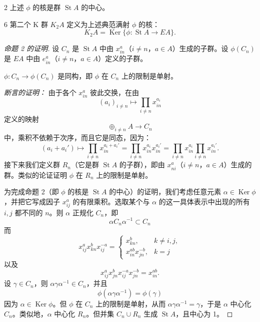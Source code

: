 \begin{prop}{2}
上述 $\phi$ 的核是群 $\operatorname{St}A$ 的中心。
\end{prop}

\begin{defn}{6}
第二个 K 群 $K_2A$ 定义为上述典范满射 $\phi$ 的核：
\[
  K_2A = \operatorname{Ker}\{\phi : \operatorname{St}A \to EA\}.
\]
\end{defn}

\begin{proof}[命题 2 的证明]
设 $C_n$ 是 $\operatorname{St}A$ 中由 $x_{in}^a$（$i\ne n$，$a\in A$）生成的子群。设 $\phi(C_n)$ 是 $EA$ 中由 $e_{in}^a$（$i\ne n$，$a\in A$）定义的子群。

 $\phi : C_n \to \phi(C_n)$ 是同构，即 $\phi$ 在 $C_n$ 上的限制是单射。

\emph{断言的证明：} 由于各个 $x_{in}^a$ 彼此交换，在由
\[
  (a_i)_{i\ne n} \mapsto \prod_{i\ne n} x_{in}^{a_i}
\]
定义的映射
\[
  \oplus_{i\ne n} A \to C_n
\]
中，乘积不依赖于次序，而且它是同态，因为：
\[
  (a_i+a_i') \mapsto \prod_{i\ne n} x_{in}^{a_i+a_i'} = \prod_{i\ne n} x_{in}^{a_i}x_{in}^{a_i'} = \prod_{i\ne n} x_{in}^{a_i}\prod_{i\ne n} x_{in}^{a_i'}.
\]
接下来我们定义群 $R_n$（它是群 $\operatorname{St}A$ 的子群），即由 $x_{ni}^a$（$i\ne n$，$a\in A$）生成的群。类似的论证证明 $\phi$ 在 $R_n$ 上的限制是单射。

为完成命题 2（即 $\phi$ 的核是 $\operatorname{St}A$ 的中心）的证明，我们考虑任意元素 $\alpha\in\operatorname{Ker}\phi$，并把它写成因子 $x_{ij}^a$ 的有限乘积。选取某个与 $\alpha$ 的这一具体表示中出现的所有 $i,j$ 都不同的 $n$。则 $\alpha$ 正规化 $C_n$，即
\[
  \alpha C_n\alpha^{-1} \subset C_n
\]
而
\[
  x_{ij}^a x_{kn}^b x_{ij}^{-a} =
  \begin{cases}
    x_{kn}^b, & k\ne i,j, \\
    x_{in}^{ab}x_{jn}^{-b}, & k=j
  \end{cases}
\]
以及
\[
  x_{ij}^a x_{jn}^b x_{ij}^{-a}x_{jn}^{-b} = x_{in}^{ab}.
\]
设 $\gamma\in C_n$，则 $\alpha\gamma\alpha^{-1}\in C_n$，并且
\[
  \phi(\alpha\gamma\alpha^{-1}) = \phi(\gamma)
\]
因为 $\alpha\in\operatorname{Ker}\phi$。但 $\phi$ 在 $C_n$ 上的限制是单射，从而 $\alpha\gamma\alpha^{-1}=\gamma$，于是 $\alpha$ 中心化 $C_n$。类似地，$\alpha$ 中心化 $R_n$。但并集 $C_n\cup R_n$ 生成 $\operatorname{St}A$，且中心为 1。
\end{proof}


